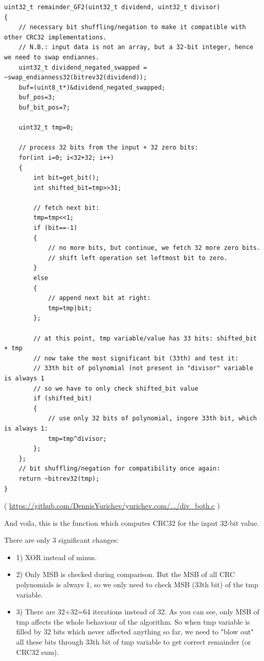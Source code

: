 \begin{lstlisting}
uint32_t remainder_GF2(uint32_t dividend, uint32_t divisor)
{
	// necessary bit shuffling/negation to make it compatible with other CRC32 implementations.
	// N.B.: input data is not an array, but a 32-bit integer, hence we need to swap endiannes.
	uint32_t dividend_negated_swapped = ~swap_endianness32(bitrev32(dividend));
	buf=(uint8_t*)&dividend_negated_swapped;
	buf_pos=3;
	buf_bit_pos=7;

	uint32_t tmp=0;

	// process 32 bits from the input + 32 zero bits:
	for(int i=0; i<32+32; i++)
	{
		int bit=get_bit();
		int shifted_bit=tmp>>31;

		// fetch next bit:
		tmp=tmp<<1;
		if (bit==-1)
		{
			// no more bits, but continue, we fetch 32 more zero bits.
			// shift left operation set leftmost bit to zero.
		}
		else
		{
			// append next bit at right:
			tmp=tmp|bit;
		};

		// at this point, tmp variable/value has 33 bits: shifted_bit + tmp
		// now take the most significant bit (33th) and test it:
		// 33th bit of polynomial (not present in "divisor" variable is always 1
		// so we have to only check shifted_bit value
		if (shifted_bit)
		{
			// use only 32 bits of polynomial, ingore 33th bit, which is always 1:
			tmp=tmp^divisor;
		};
	};
	// bit shuffling/negation for compatibility once again:
	return ~bitrev32(tmp);
}
\end{lstlisting}

( \url{https://github.com/DennisYurichev/yurichev.com/.../div_both.c} )

And voila, this is the function which computes CRC32 for the input 32-bit value.

There are only 3 significant changes:

\begin{itemize}

\item 1) XOR instead of minus.

\item 2) Only MSB is checked during comparison. But the MSB of all CRC polynomials is always 1,
so we only need to check MSB (33th bit) of the tmp variable.

\item 3) There are 32+32=64 iterations instead of 32.
As you can see, only MSB of tmp affects the whole behaviour of the algorithm.
So when tmp variable is filled by 32 bits which never affected anything so far,
we need to "blow out" all these bits through 33th bit of tmp variable to get correct remainder (or CRC32 sum).

\end{itemize}

